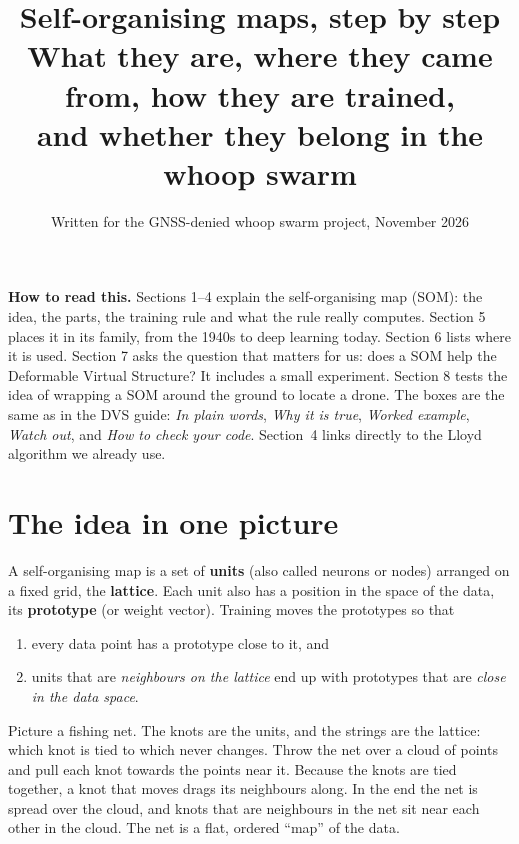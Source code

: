 \documentclass[11pt,a4paper]{article}
\title{\textbf{Self-organising maps, step by step}\\[3pt]
\large What they are, where they came from, how they are trained,\\
and whether they belong in the whoop swarm}
\date{Written for the GNSS-denied whoop swarm project, November 2026}
\begin{document}
\maketitle
\vspace{-1em}
\begin{center}
\begin{minipage}{0.9\textwidth}\small
\textbf{How to read this.} Sections 1--4 explain the self-organising map (SOM): the idea, the parts, the training
rule and what the rule really computes. Section 5 places it in its family, from the 1940s to deep learning today.
Section 6 lists where it is used. Section 7 asks the question that matters for us: does a SOM help the Deformable
Virtual Structure? It includes a small experiment. Section 8 tests the idea of wrapping a SOM around the ground
to locate a drone. The boxes are the same as in the DVS guide: \emph{In plain
words}, \emph{Why it is true}, \emph{Worked example}, \emph{Watch out}, and \emph{How to check your code}.
Section~4 links directly to the Lloyd algorithm we already use.
\end{minipage}
\end{center}

\tableofcontents
\vspace{1em}

\section{The idea in one picture}

A self-organising map is a set of \textbf{units} (also called neurons or nodes) arranged on a fixed grid, the
\textbf{lattice}. Each unit also has a position in the space of the data, its \textbf{prototype} (or weight
vector). Training moves the prototypes so that
\begin{enumerate}[leftmargin=*]
\item every data point has a prototype close to it, and
\item units that are \emph{neighbours on the lattice} end up with prototypes that are \emph{close in the data space}.
\end{enumerate}

\begin{plainbox}
Picture a fishing net. The knots are the units, and the strings are the lattice: which knot is tied to which never
changes. Throw the net over a cloud of points and pull each knot towards the points near it. Because the knots are
tied together, a knot that moves drags its neighbours along. In the end the net is spread over the cloud, and knots
that are neighbours in the net sit near each other in the cloud. The net is a flat, ordered ``map'' of the data.
\end{plainbox}
\end{document}
